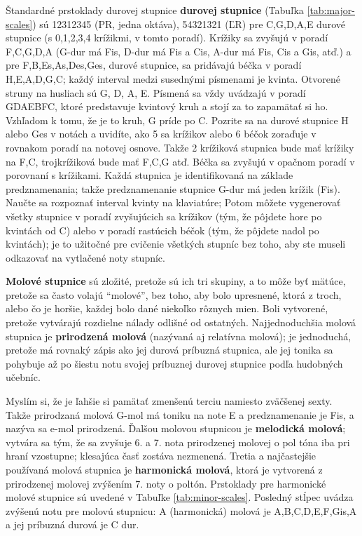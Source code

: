 \documentclass[11pt,a4paper]{book}
\begin{document}
Štandardné prstoklady durovej stupnice \textbf{durovej stupnice} (Tabuľka \ref{tab:major-scales}) sú 12312345 (PR, jedna oktáva), 54321321 (ĽR) pre C,G,D,A,E durové stupnice (s 0,1,2,3,4 krížikmi, v tomto poradí). Krížiky sa zvyšujú v poradí F,C,G,D,A (G-dur má Fis, D-dur má Fis a Cis, A-dur má Fis, Cis a Gis, atď.) a pre F,B,Es,As,Des,Ges, durové stupnice, sa pridávajú béčka v poradí H,E,A,D,G,C; každý interval medzi susednými písmenami je kvinta. Otvorené struny na husliach sú G, D, A, E. Písmená sa vždy uvádzajú v poradí GDAEBFC, ktoré predstavuje kvintový kruh a stojí za to zapamätať si ho. Vzhľadom k tomu, že je to kruh, G príde po C. Pozrite sa na durové stupnice H alebo Ges v notách a uvidíte, ako 5 sa krížikov alebo 6 béčok zoraďuje v rovnakom poradí na notovej osnove. Takže 2 krížiková stupnica bude mať krížiky na F,C, trojkrížiková bude mať F,C,G atď. Béčka sa zvyšujú v opačnom poradí v porovnaní s krížikami. Každá stupnica je identifikovaná na základe  predznamenania; takže predznamenanie stupnice G-dur má jeden krížik (Fis). Naučte sa rozpoznať interval kvinty na klaviatúre; Potom môžete vygenerovať všetky stupnice v poradí zvyšujúcich sa krížikov (tým, že pôjdete hore po kvintách od C) alebo v poradí rastúcich béčok (tým, že pôjdete nadol po kvintách); je to užitočné pre cvičenie všetkých stupníc bez toho, aby ste museli odkazovať na vytlačené noty stupníc.

\textbf{Molové stupnice} sú zložité, pretože sú ich tri skupiny, a to môže byť mätúce, pretože sa často volajú “molové”, bez toho, aby bolo upresnené, ktorá z troch, alebo čo je horšie, každej bolo dané niekoľko rôznych mien. Boli vytvorené, pretože vytvárajú rozdielne nálady odlišné od ostatných. Najjednoduchšia molová stupnica je \textbf{prirodzená molová} (nazývaná aj relatívna molová); je jednoduchá, pretože má rovnaký zápis ako jej durová príbuzná stupnica, ale jej tonika sa pohybuje až po šiestu notu svojej príbuznej durovej stupnice podľa hudobných učebníc. 

Myslím si, že je ľahšie si pamätať zmenšenú terciu namiesto zväčšenej sexty. Takže prirodzaná molová G-mol má toniku na note E a predznamenanie je Fis, a nazýva sa e-mol prirodzená. Ďalšou molovou stupnicou je \textbf{melodická molová}; vytvára sa tým, že sa zvyšuje 6. a 7. nota prirodzenej molovej o pol tóna iba pri hraní vzostupne; klesajúca časť zostáva nezmenená. Tretia a najčastejšie používaná molová stupnica je \textbf{harmonická molová}, ktorá je vytvorená z prirodzenej molovej zvýšením 7. noty o poltón. Prstoklady pre harmonické molové stupnice sú uvedené v Tabuľke \ref{tab:minor-scales}. Posledný stĺpec uvádza zvýšenú notu pre molovú stupnicu: A (harmonická) molová je A,B,C,D,E,F,Gis,A a jej príbuzná durová je C dur. 
\end{document}
